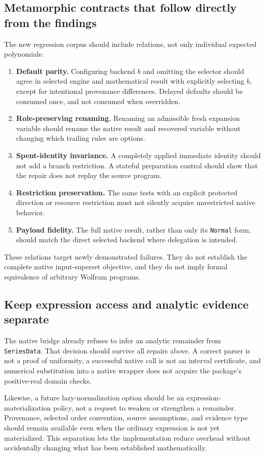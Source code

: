 \documentclass[11pt]{article}
\newcommand{\code}[1]{\texttt{#1}}
\begin{document}
\subsection{Metamorphic contracts that follow directly from the findings}
The new regression corpus should include relations, not only individual expected polynomials:
\begin{enumerate}
\item \textbf{Default parity.} Configuring backend $b$ and omitting the selector should agree in selected engine and mathematical result with explicitly selecting $b$, except for intentional provenance differences. Delayed defaults should be consumed once, and not consumed when overridden.
\item \textbf{Role-preserving renaming.} Renaming an admissible fresh expansion variable should rename the native result and recovered variable without changing which trailing rules are options.
\item \textbf{Spent-identity invariance.} A completely applied immediate identity should not add a branch restriction. A stateful preparation control should show that the repair does not replay the source program.
\item \textbf{Restriction preservation.} The same tests with an explicit protected direction or resource restriction must not silently acquire unrestricted native behavior.
\item \textbf{Payload fidelity.} The full native result, rather than only its \code{Normal} form, should match the direct selected backend where delegation is intended.
\end{enumerate}
These relations target newly demonstrated failures. They do not establish the complete native input-superset objective, and they do not imply formal equivalence of arbitrary Wolfram programs.

\subsection{Keep expression access and analytic evidence separate}
The native bridge already refuses to infer an analytic remainder from \code{SeriesData}. That decision should survive all repairs above. A correct parser is not a proof of uniformity, a successful native call is not an interval certificate, and numerical substitution into a native wrapper does not acquire the package's positive-real domain checks.

Likewise, a future lazy-normalization option should be an expression-materialization policy, not a request to weaken or strengthen a remainder. Provenance, selected order convention, source assumptions, and evidence type should remain available even when the ordinary expression is not yet materialized. This separation lets the implementation reduce overhead without accidentally changing what has been established mathematically.
\end{document}
